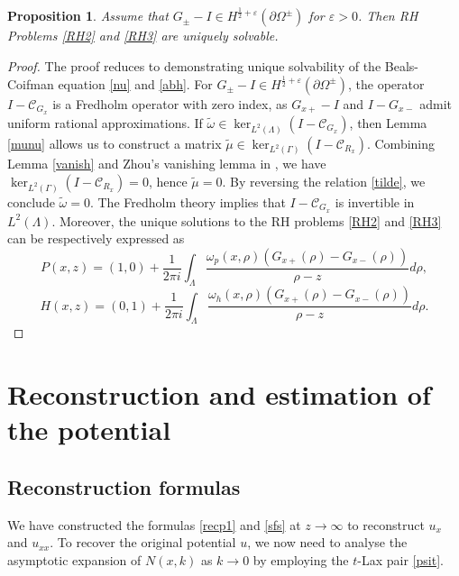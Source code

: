 \documentclass[preprint,compress,12pt]{elsarticle}
\newtheorem{proposition}[theorem]{Proposition}
\numberwithin{equation}{section}
\begin{document}
\begin{proposition}\label{con}
Assume that $G_{\pm}-I\in H^{\frac{1}{2}+\varepsilon}(\partial\Omega^{\pm})$ for $\varepsilon>0$. Then RH Problems \ref{RH2} and \ref{RH3} are uniquely solvable.
\end{proposition}
\begin{proof}
The proof reduces to demonstrating unique solvability of the Beals-Coifman equation \eqref{nu} and \eqref{abh}. For $G_{\pm}-I\in H^{\frac{1}{2}+\varepsilon}(\partial\Omega^{\pm})$, the operator  $I-\mathcal{C}_{G_{x}}$ is a Fredholm operator with zero index, as $G_{x+}-I$ and $I-G_{x-}$ admit uniform rational approximations.
If $\tilde{\omega}\in \ker_{L^{2}(\Lambda)}(I-\mathcal{C}_{G_{x}})$,  then Lemma \ref{munu} allows us to construct a matrix $\tilde{\mu}\in \ker_{L^{2}(\Gamma)}(I-\mathcal{C}_{R_{x}})$. Combining Lemma \ref{vanish} and Zhou's vanishing lemma in \cite{Zhou1989b}, we have $\ker_{L^{2}(\Gamma)}(I-\mathcal{C}_{R_{x}})=0$,  hence $\tilde{\mu}=0$. By reversing the relation \eqref{tilde}, we conclude $\tilde{\omega}=0$. The Fredholm theory implies that
$I-\mathcal{C}_{G_{x}}$ is invertible in $L^{2}(\Lambda)$. Moreover, the unique solutions to the RH problems \ref{RH2} and \ref{RH3} can be respectively expressed as
\begin{equation}\label{ppp}
P(x,z)=(1,0)+\frac{1}{2\pi i}\int_{\Lambda}\frac{\omega_{p}(x,\rho)\left(G_{x+}(\rho)-G_{x-}(\rho)\right)}{\rho-z}d\rho,
\end{equation}
\begin{equation}\label{hhh}
     H(x,z)=(0,1)+\frac{1}{2\pi i}\int_{\Lambda}\frac{\omega_{h}(x,\rho)\left(G_{x+}(\rho)-G_{x-}(\rho)\right)}{\rho-z}d\rho.
      \end{equation}
\end{proof}
\section{Reconstruction and estimation of the potential}\label{sec4}
\subsection{Reconstruction formulas}\label{sub41}
We have constructed the formulas \eqref{recp1} and  \eqref{sfs} at $z\to\infty$ to reconstruct $u_{x}$ and $u_{xx}$. To recover the original potential $u$, we now need to analyse the asymptotic expansion of $N(x,k)$ as $k\to 0$ by employing the $t$-Lax pair \eqref{psit}.
\end{document}
